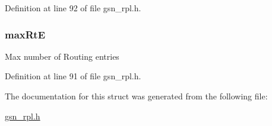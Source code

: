 Definition at line 92 of file gsn\_\-rpl.h.

\hypertarget{a00197_a17ffd82e8cd233649b9a6a7f3477ebf9}{
\subsubsection[{maxRtE}]{ {\bf maxRtE}}}
\label{a00197_a17ffd82e8cd233649b9a6a7f3477ebf9}
Max number of Routing entries 

Definition at line 91 of file gsn\_\-rpl.h.



The documentation for this struct was generated from the following file:\begin{DoxyCompactItemize}
\item 
\hyperlink{a00579}{gsn\_\-rpl.h}\end{DoxyCompactItemize}

